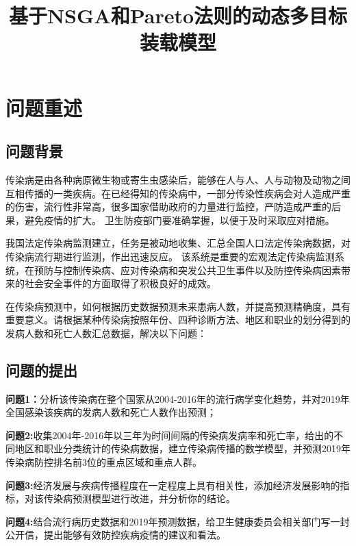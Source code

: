 \documentclass{whutmod}
\title{基于NSGA和Pareto法则的动态多目标装载模型}
\begin{document}
\maketitle

\begin{abstract}
\end{abstract}

\tableofcontents
\thispagestyle{empty}
\newpage
\setcounter{page}{1}

\section{问题重述}
\subsection{问题背景}

传染病是由各种病原微生物或寄生虫感染后，能够在人与人、人与动物及动物之间互相传播的一类疾病。在已经得知的传染病中，一部分传染性疾病会对人造成严重的伤害，流行性非常高，很多国家借助政府的力量进行监控，严防造成严重的后果，避免疫情的扩大。
卫生防疫部门要准确掌握，以便于及时采取应对措施。

我国法定传染病监测建立，任务是被动地收集、汇总全国人口法定传染病数据，对传染病流行期进行监测，作出迅速反应。
该系统是重要的宏观法定传染病监测系统，在预防与控制传染病、应对传染病和突发公共卫生事件以及防控传染病因素带来的社会安全事件的方面取得了积极良好的成效。

在传染病预测中，如何根据历史数据预测未来患病人数，并提高预测精确度，具有重要意义。请根据某种传染病按照年份、四种诊断方法、地区和职业的划分得到的发病人数和死亡人数汇总数据，解决以下问题：

\subsection{问题的提出}
\textbf{问题1：}分析该传染病在整个国家从2004-2016年的流行病学变化趋势，并对2019年全国感染该疾病的发病人数和死亡人数作出预测；

\textbf{问题2:}收集2004年-2016年以三年为时间间隔的传染病发病率和死亡率，给出的不同地区和职业分类统计的传染病数据，建立传染病传播的数学模型，并预测2019年传染病防控排名前3位的重点区域和重点人群。

\textbf{问题3:}经济发展与疾病传播程度在一定程度上具有相关性，添加经济发展影响的指标，对该传染病预测模型进行改进，并分析你的结论。

\textbf{问题4:}结合流行病历史数据和2019年预测数据，给卫生健康委员会相关部门写一封公开信，提出能够有效防控疾病疫情的建议和看法。
\newpage 
\end{document}
